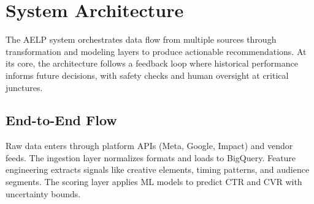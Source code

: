 \documentclass[11pt,a4paper]{report}
\begin{document}
\chapter{System Architecture}

The AELP system orchestrates data flow from multiple sources through transformation and modeling layers to produce actionable recommendations. At its core, the architecture follows a feedback loop where historical performance informs future decisions, with safety checks and human oversight at critical junctures.

\section{End-to-End Flow}

Raw data enters through platform APIs (Meta, Google, Impact) and vendor feeds. The ingestion layer normalizes formats and loads to BigQuery. Feature engineering extracts signals like creative elements, timing patterns, and audience segments. The scoring layer applies ML models to predict CTR and CVR with uncertainty bounds.

\clearpage %
\end{document}
